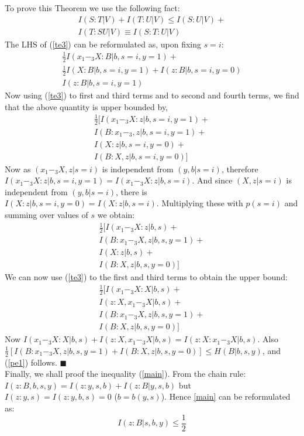 To prove this Theorem we use the following fact:
\begin{eqnarray} \label{te3}
I(S:T|V)+I(T:U|V) \leq 
I(S:U|V)+\nonumber \\ I(T:SU|V)  \equiv I(S:T:U|V)
\end{eqnarray}
The LHS of (\ref{te3}) can be reformulated as, upon fixing $s=i$:
\begin{eqnarray}
\frac{1}{2}I(x_1-_3X:B|b,s=i,y=1)+\nonumber \\ \frac{1}{2}I(X:B|b,s=i,y=1)+I(z:B|b,s=i,y=0) \nonumber \\ I(z:B|b,s=i,y=1)
\end{eqnarray}
Now using (\ref{te3}) to first and third terms and to second and fourth terms, we find that the above quantity is upper bounded by,
\begin{multline}
\frac{1}{2}[I(x_1-_3X:z|b,s=i,y=1)+ \\ I(B:x_1-_3,z|b,s=i,y=1)+ \\ I(X:z|b,s=i,y=0) + \\ I(B:X,z|b,s=i,y=0)]
\end{multline}
Now as $(x_1-_3X,z|s=i)$ is independent from $(y,b|s=i)$, therefore $I(x_1-_3X:z|b,s=i,y=1)=I(x_1-_3X:z|b,s=i)$. And since $(X,z|s=i)$ is independent from $(y,b|s=i)$, there is $I(X:z|b,s=i,y=0)=I(X:z|b,s=i)$. Multiplying these with $p(s=i)$ and summing over values of $s$ we obtain:
\begin{multline}
\frac{1}{2}[I(x_1-_3X:z|b,s)+ \\ I(B:x_1-_3X,z|b,s,y=1)+ \\ I(X:z|b,s) + \\ I(B:X,z|b,s,y=0)]
\end{multline}
We can now use (\ref{te3}) to the first and third terms to obtain the upper bound:
\begin{multline}
\frac{1}{2}[I(x_1-_3X:X|b,s)+ \\ I(z:X,x_1-_3X|b,s)+ \\ I(B:x_1-_3X,z|b,s,y=1) + \\ I(B:X,z|b,s,y=0)]
\end{multline}
Now $I(x_1-_3X:X|b,s)+I(z:X,x_1-_3X|b,s)=I(z:X:x_1-_3X|b,s)$. Also 
$\frac{1}{2}[I(B:x_1-_3X,z|b,s,y=1) +  I(B:X,z|b,s,y=0)]\leq H(B|b,s,y)$, and (\ref{pe1}) follows. $\blacksquare$\\
Finally, we shall proof the inequality (\ref{main}). From the chain rule: $I(z:B,b,s,y)=I(z:y,s,b)+I(z:B|y,s,b)$ but $I(z:y,s)=I(z:y,b,s)=0$ ($b=b(y,s)$). Hence \ref{main} can be reformulated as:
\begin{equation} \label{main2}
I(z:B|s,b,y)\leq \frac{1}{2}
\end{equation}
